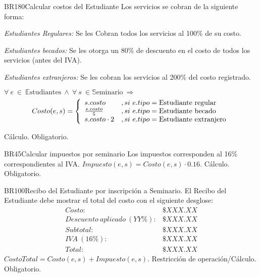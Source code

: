 \begin{BussinesRule}{BR180}{Calcular costos del Estudiante}
	\BRitem[Descripción:] Los servicios se cobran de la siguiente forma:
		\begin{Citemize}
			\item {\em Estudiantes Regulares:} Se les Cobran todos los servicios al 100\% de su costo.
			\item {\em Estudiantes becados:} Se les otorga un 80\% de descuento en el costo de todos los servicios (antes del IVA).
			\item {\em Estudiantes extranjeros:} Se les cobran los servicios al 200\% del costo registrado.
		\end{Citemize}
	\BRitem[Sentencia:] $\forall~e~\in~\mathbb{E}\textrm{studiantes}~\land~\forall~s~\in \mathbb{S}\textrm{eminario}~\Rightarrow$
		\begin{displaymath}
			Costo(e,s) = \left\{ \begin{array}{ll}
			s.costo & , si~e.tipo = \textrm{Estudiante regular}\\
			{s.costo}\over{5} & , si~e.tipo = \textrm{Estudiante becado}\\
			s.costo \cdot 2 & , si~e.tipo = \textrm{Estudiante extranjero}
			\end{array} \right.
		\end{displaymath}

	\BRitem[Tipo:] Cálculo.
	\BRitem[Nivel:] Obligatorio.
\end{BussinesRule}

\begin{BussinesRule}{BR45}{Calcular impuestos por seminario}
	\BRitem[Descripción:] Los impuestos corresponden al 16\% correspondientes al IVA.
	\BRitem[Sentencia:] $Impuesto(e, s) = Costo(e, s)\cdot0.16$.
	\BRitem[Tipo:] Cálculo.
	\BRitem[Nivel:] Obligatorio.
\end{BussinesRule}

\begin{BussinesRule}{BR100}{Recibo del Estudiante por inscripción a Seminario.}
	\BRitem[Descripción:] El  Recibo del Estudiante debe mostrar el total del costo con el siguiente desglose:
		\begin{displaymath}\begin{array}{lr}
			Costo: & \$ XXX.XX\\
			Descuento~aplicado~(YY\%): & \$ XXX.XX\\
			Subtotal: & \$ XXX.XX\\
			IVA~(16\%): & \$ XXX.XX\\\hline
			Total: & \$ XXX.XX
		\end{array}\end{displaymath}
	\BRitem[Sentencia:] $CostoTotal = Costo(e, s) + Impuesto(e, s)$.
	\BRitem[Tipo:] Restricción de operación/Cálculo.
	\BRitem[Nivel:] Obligatorio.
\end{BussinesRule}



